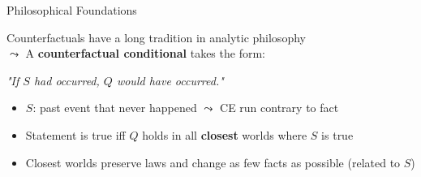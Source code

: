 \documentclass[10pt,compress,t,notes=noshow, xcolor=table]{beamer}
\begin{document}
\begin{frame}{Philosophical Foundations }

Counterfactuals have a long tradition in analytic philosophy\\
$\leadsto$ A \textbf{counterfactual conditional} takes the form:

\begin{center}
  \emph{"If $S$ had occurred, $Q$ would have occurred."}
\end{center}

  \begin{itemize}%
    \item $S$: past event that never happened 
    $\leadsto$ CE run contrary to fact
    \item Statement is true iff $Q$ holds in all \textbf{closest} worlds where $S$ is true
    \item Closest worlds preserve laws and change as few facts as possible (related to $S$)
  \end{itemize}
\end{frame}
\end{document}
